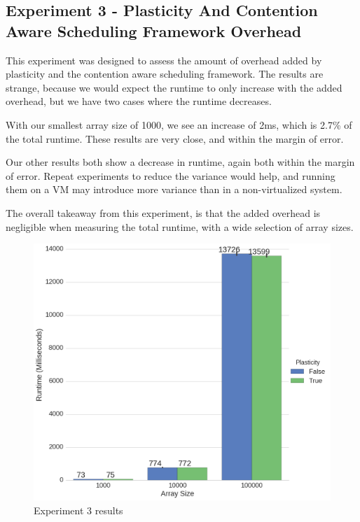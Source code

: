 



\subsection{Experiment 3 - Plasticity And Contention Aware Scheduling Framework Overhead}

This experiment was designed to assess the amount of overhead added by plasticity and the contention aware scheduling framework. The results are strange, because we would expect the runtime to only increase with the added overhead, but we have two cases where the runtime decreases. 

With our smallest array size of 1000, we see an increase of 2ms, which is 2.7\% of the total runtime. These results are very close, and within the margin of error. 

Our other results both show a decrease in runtime, again both within the margin of error. Repeat experiments to reduce the variance would help, and running them on a VM may introduce more variance than in a non-virtualized system.

The overall takeaway from this experiment, is that the added overhead is negligible when measuring the total runtime, with a wide selection of array sizes.



\begin{figure}[H]
	\centering
	\includegraphics[width=\textwidth]{graphics/experiment3.png}
	\caption{Experiment 3 results}
	\label{fig:results_ex3}
\end{figure}

